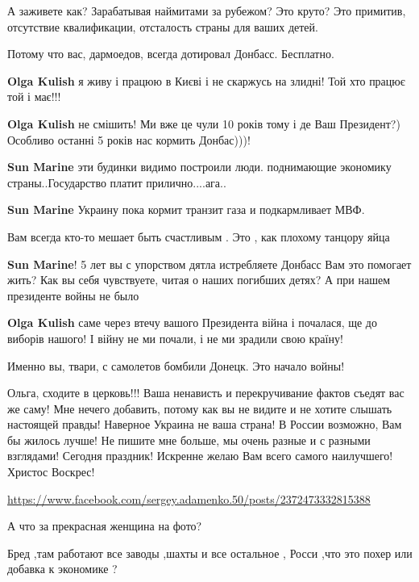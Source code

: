 \begin{itemize}
\begin{itemize}
А заживете как? Зарабатывая наймитами за рубежом? Это круто? Это примитив, отсутствие квалификации, отсталость страны для ваших детей.

Потому что вас, дармоедов, всегда дотировал Донбасс. Бесплатно.

\textbf{Olga Kulish} я живу і працюю в Києві і не скаржусь на злидні! Той хто працює той і має!!!

\textbf{Olga Kulish} не смішить! Ми вже це чули 10 років тому і де Ваш Президент?) Особливо останні 5 років нас кормить Донбас)))!

\textbf{Sun Marine} эти будинки видимо построили люди. поднимающие экономику страны..Государство платит прилично....ага..

\textbf{Sun Marine} Украину пока кормит транзит газа и подкармливает МВФ.

Вам всегда кто-то мешает быть счастливым . Это , как плохому танцору яйца

\textbf{Sun Marine}! 5 лет вы с упорством дятла истребляете Донбасс Вам это помогает жить? Как вы себя чувствуете, читая о наших погибших детях? А при нашем президенте войны не было

\textbf{Olga Kulish} саме через втечу вашого Президента війна і почалася, ще до виборів нашого! І війну не ми почали, і не ми зрадили свою країну!

Именно вы, твари, с самолетов бомбили Донецк. Это начало войны!


Ольга, сходите в церковь!!! Ваша ненависть и перекручивание фактов съедят вас
же саму! Мне нечего добавить, потому как вы не видите и не хотите слышать
настоящей правды! Наверное Украина не ваша страна! В России возможно, Вам бы
жилось лучше! Не пишите мне больше, мы очень разные и с разными взглядами!
Сегодня праздник! Искренне желаю Вам всего самого наилучшего! Христос Воскрес!

\end{itemize} %


\url{https://www.facebook.com/sergey.adamenko.50/posts/2372473332815388}

А что за прекрасная женщина на фото?

Бред ,там работают все заводы ,шахты и все остальное , Росси ,что это похер или добавка к экономике ?


\end{itemize}
